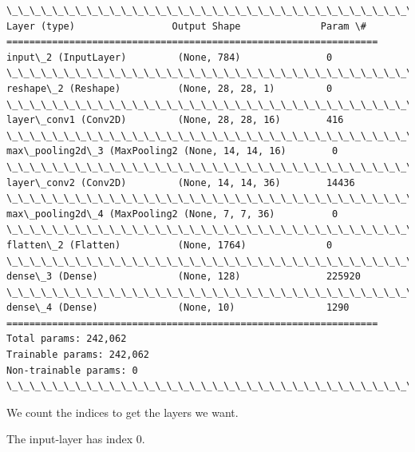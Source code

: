 \documentclass[11pt]{article}
\begin{document}
    \begin{Verbatim}[commandchars=\\\{\}]
\_\_\_\_\_\_\_\_\_\_\_\_\_\_\_\_\_\_\_\_\_\_\_\_\_\_\_\_\_\_\_\_\_\_\_\_\_\_\_\_\_\_\_\_\_\_\_\_\_\_\_\_\_\_\_\_\_\_\_\_\_\_\_\_\_
Layer (type)                 Output Shape              Param \#   
=================================================================
input\_2 (InputLayer)         (None, 784)               0         
\_\_\_\_\_\_\_\_\_\_\_\_\_\_\_\_\_\_\_\_\_\_\_\_\_\_\_\_\_\_\_\_\_\_\_\_\_\_\_\_\_\_\_\_\_\_\_\_\_\_\_\_\_\_\_\_\_\_\_\_\_\_\_\_\_
reshape\_2 (Reshape)          (None, 28, 28, 1)         0         
\_\_\_\_\_\_\_\_\_\_\_\_\_\_\_\_\_\_\_\_\_\_\_\_\_\_\_\_\_\_\_\_\_\_\_\_\_\_\_\_\_\_\_\_\_\_\_\_\_\_\_\_\_\_\_\_\_\_\_\_\_\_\_\_\_
layer\_conv1 (Conv2D)         (None, 28, 28, 16)        416       
\_\_\_\_\_\_\_\_\_\_\_\_\_\_\_\_\_\_\_\_\_\_\_\_\_\_\_\_\_\_\_\_\_\_\_\_\_\_\_\_\_\_\_\_\_\_\_\_\_\_\_\_\_\_\_\_\_\_\_\_\_\_\_\_\_
max\_pooling2d\_3 (MaxPooling2 (None, 14, 14, 16)        0         
\_\_\_\_\_\_\_\_\_\_\_\_\_\_\_\_\_\_\_\_\_\_\_\_\_\_\_\_\_\_\_\_\_\_\_\_\_\_\_\_\_\_\_\_\_\_\_\_\_\_\_\_\_\_\_\_\_\_\_\_\_\_\_\_\_
layer\_conv2 (Conv2D)         (None, 14, 14, 36)        14436     
\_\_\_\_\_\_\_\_\_\_\_\_\_\_\_\_\_\_\_\_\_\_\_\_\_\_\_\_\_\_\_\_\_\_\_\_\_\_\_\_\_\_\_\_\_\_\_\_\_\_\_\_\_\_\_\_\_\_\_\_\_\_\_\_\_
max\_pooling2d\_4 (MaxPooling2 (None, 7, 7, 36)          0         
\_\_\_\_\_\_\_\_\_\_\_\_\_\_\_\_\_\_\_\_\_\_\_\_\_\_\_\_\_\_\_\_\_\_\_\_\_\_\_\_\_\_\_\_\_\_\_\_\_\_\_\_\_\_\_\_\_\_\_\_\_\_\_\_\_
flatten\_2 (Flatten)          (None, 1764)              0         
\_\_\_\_\_\_\_\_\_\_\_\_\_\_\_\_\_\_\_\_\_\_\_\_\_\_\_\_\_\_\_\_\_\_\_\_\_\_\_\_\_\_\_\_\_\_\_\_\_\_\_\_\_\_\_\_\_\_\_\_\_\_\_\_\_
dense\_3 (Dense)              (None, 128)               225920    
\_\_\_\_\_\_\_\_\_\_\_\_\_\_\_\_\_\_\_\_\_\_\_\_\_\_\_\_\_\_\_\_\_\_\_\_\_\_\_\_\_\_\_\_\_\_\_\_\_\_\_\_\_\_\_\_\_\_\_\_\_\_\_\_\_
dense\_4 (Dense)              (None, 10)                1290      
=================================================================
Total params: 242,062
Trainable params: 242,062
Non-trainable params: 0
\_\_\_\_\_\_\_\_\_\_\_\_\_\_\_\_\_\_\_\_\_\_\_\_\_\_\_\_\_\_\_\_\_\_\_\_\_\_\_\_\_\_\_\_\_\_\_\_\_\_\_\_\_\_\_\_\_\_\_\_\_\_\_\_\_

    \end{Verbatim}

    We count the indices to get the layers we want.

The input-layer has index 0.
\end{document}
